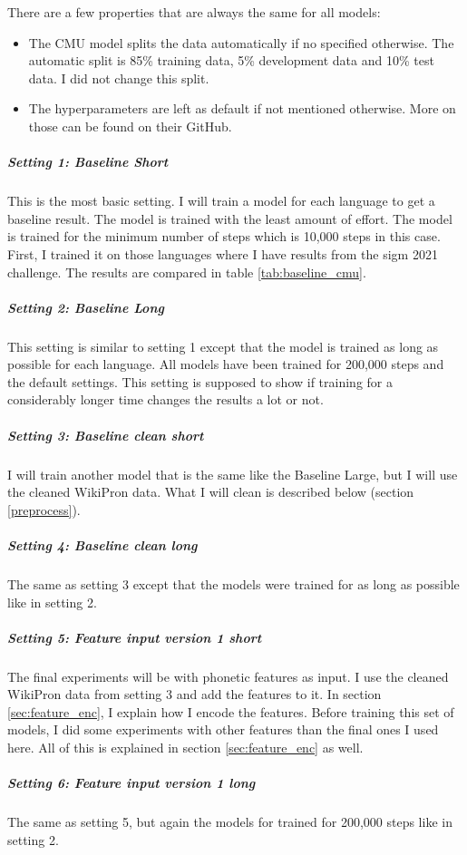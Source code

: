 There are a few properties that are always the same for all models:
\begin{itemize}
\item The CMU model splits the data automatically if no specified otherwise. The automatic split is 85\% training data, 5\% development data and 10\% test data. I did not change this split.
\item The hyperparameters are left as default if not mentioned otherwise. More on those can be found on their GitHub. 
\end{itemize}

\subparagraph{Setting 1: Baseline Short}
This is the most basic setting. I will train a model for each language to get a baseline result. The model is trained with the least amount of effort. The model is trained for the minimum number of steps which is 10,000 steps in this case. First, I trained it on those languages where I have results from the \ac{sigm} 2021 challenge. The results are compared in table \ref{tab:baseline_cmu}.

\subparagraph{Setting 2: Baseline Long}
This setting is similar to setting 1 except that the model is trained as long as possible for each language. All models have been trained for 200,000 steps and the default settings. This setting is supposed to show if training for a considerably longer time changes the results a lot or not.

\subparagraph{Setting 3: Baseline clean short}
I will train another model that is the same like the Baseline Large, but I will use the cleaned WikiPron data. What I will clean is described below (section \ref{preprocess}).

\subparagraph{Setting 4: Baseline clean long}
The same as setting 3 except that the models were trained for as long as possible like in setting 2.

\subparagraph{Setting 5: Feature input version 1 short}
The final experiments will be with phonetic features as input. I use the cleaned WikiPron data from setting 3 and add the features to it. In section \ref{sec:feature_enc}, I explain how I encode the features. Before training this set of models, I did some experiments with other features than the final ones I used here. All of this is explained in section \ref{sec:feature_enc} as well.

\subparagraph{Setting 6: Feature input version 1 long}
The same as setting 5, but again the models for trained for 200,000 steps like in setting 2.

